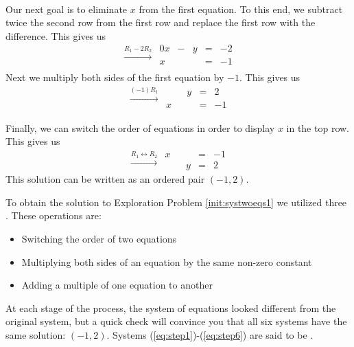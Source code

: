\documentclass{ximera}
\begin{document}
\begin{exploration}
\begin{equation}
\begin{array}{ccccc}
    \end{array}
    \end{equation}
Our next goal is to eliminate $x$ from the first equation.  To this end, we subtract twice the second row from the first row and replace the first row with the difference. This gives us
\begin{equation}\label{eq:step4}
\begin{array}{c}
 \xrightarrow{R_1-2R_2}\\
 \\
 \end{array}
 \begin{array}{ccccc}
	 0x& -&y&=&-2\\
     x & &&= &-1 \\
    \end{array}
\end{equation}
Next we multiply both sides of the first equation by $-1$. This gives us
\begin{equation}\label{eq:step5}
\begin{array}{c}
 \xrightarrow{(-1)R_1}\\
 \\
 \end{array}
 \begin{array}{ccccc}
      & &y&=&2\\
      x & &&= &-1
    \end{array}
\end{equation}    
    
Finally, we can switch the order of equations in order to display $x$ in the top row.  This gives us
\begin{equation}\label{eq:step6}
\begin{array}{c}
 \xrightarrow{R_1\leftrightarrow R_2}\\
 
 \end{array}
\begin{array}{ccccc}
      x & &&= &-1\\
      & &y&=&2      
    \end{array}
\end{equation}    
This solution can be written as an ordered pair $(-1, 2)$.  
\end{exploration}

To obtain the solution to Exploration Problem \ref{init:systwoeqs1} we utilized three .  These operations are:
\begin{itemize}
\item Switching the order of two equations
\item Multiplying both sides of an equation by the same non-zero constant
\item Adding a multiple of one equation to another
\end{itemize}
At each stage of the process, the system of equations looked different from the original system, but a quick check will convince you that all six systems have the same solution: $(-1, 2)$.  Systems (\ref{eq:step1})-(\ref{eq:step6}) are said to be .  
\end{document}
